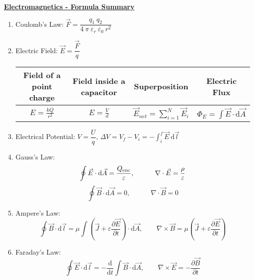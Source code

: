 \documentclass[a4paper, 11pt]{article}
\begin{document}
\underline{\Large{\textbf{Electromagnetics - Formula Summary}}} \vspace{.5cm}

\begin{enumerate}
    \item Coulomb's Law: $\vec{F} = \dfrac{q_{1} \ q_{2}}{4 \ \pi \ \varepsilon_{r} \ \varepsilon_{0} \ r^{2}}$

    \item Electric Field: $\vec{E} = \dfrac{\vec{F}}{q}$
    \begin{table}[H]
        \centering
        \begin{tabular}{cccc}
        \toprule
        Field of a point charge &
        Field inside a capacitor &
        Superposition &
        Electric Flux \\
        \midrule
        $\displaystyle E = \frac{kQ}{r^{2}}$ &
        $\displaystyle E = \frac{V}{d}$ &
        $\displaystyle \vec{E}_{net} = \sum_{i=1}^{N}\vec{E}_{i}$ &
        $\displaystyle \Phi_{E} = \int \vec{E} \cdot \mathrm{d}\vec{A}$ \\
        \bottomrule
        \end{tabular}
    \end{table}
    

    \item Electrical Potential: $V = \dfrac{U}{q}$, \quad $\displaystyle \Delta V = V_{f}-V_{i} = -\int_{i}^{f} \vec{E}\ \mathrm{d} \vec{l}$


    \item Gauss's Law:
    \[
        \oint \vec{E} \cdot \mathrm{d}\vec{A} = \frac{Q_{\rm enc}}{\varepsilon}, 
        \quad \quad \quad 
        \nabla \cdot \vec{E} = \frac{\rho}{\varepsilon}
    \]
    \[
        \oint \vec{B} \cdot \mathrm{d}\vec{A} = 0, 
        \quad \quad \quad 
        \nabla \cdot \vec{B} = 0
    \]
    
    \item Ampere's Law:
    \[
        \oint \vec{B} \cdot \mathrm{d}\vec{l} = \mu \int \left( \vec{J}+\varepsilon \frac{\partial \vec{E}}{\partial t} \right) \cdot \mathrm{d}\vec{A},
        \quad \quad
        \nabla \times \vec{B} = \mu \left( \vec{J}+\varepsilon \frac{\partial \vec{E}}{\partial t} \right)
    \]
    
    \item Faraday's Law:
    \[
        \oint \vec{E} \cdot \mathrm{d}\vec{l} = -\frac{\mathrm{d}}{\mathrm{d}t} \int\vec{B} \cdot \mathrm{d}\vec{A},
        \quad \quad
        \nabla 
        \times \vec{E} = - \frac{\partial \vec{B}}{\partial t}
    \]


\end{enumerate}
\end{document}
